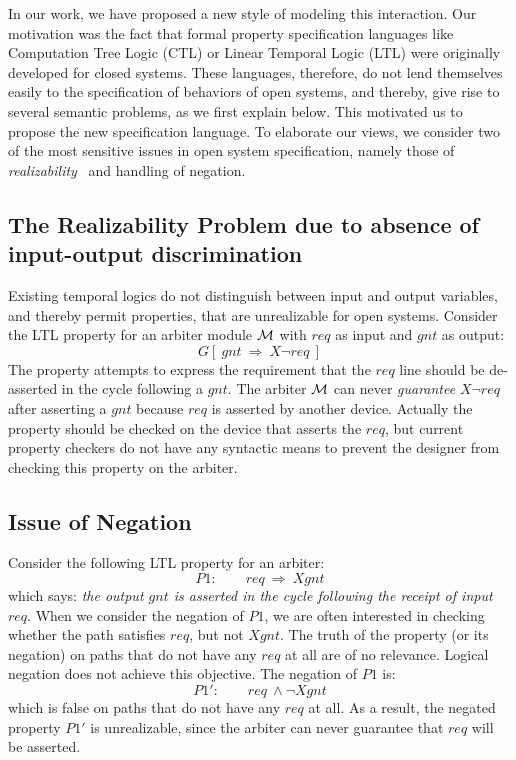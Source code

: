\documentclass[a4paper, 11pt]{article}
\begin{document}
In our work, we have proposed a new style of modeling this interaction. 
Our motivation was the fact that formal property 
specification languages like Computation Tree Logic (CTL) or Linear Temporal 
Logic (LTL) were originally developed for closed systems. These languages, 
therefore, do not lend themselves
easily to the specification of behaviors of open systems, and thereby, 
give rise to several semantic problems, as we first explain below. This 
motivated us to propose the new specification language.
To elaborate our views, we consider two of the most sensitive issues in
open system specification, namely those of {\em realizability}~\cite{rosner}
and handling of negation.

\subsection{The Realizability Problem due to absence of input-output 
	discrimination} \label{sec6.1}
Existing temporal logics do not distinguish between input and output 
variables, and thereby permit properties, that are unrealizable for 
open systems. Consider the LTL
property for an arbiter module ${\cal M}$ with $req$ as input and $gnt$ as
output:
\[  G[\ gnt\ \Rightarrow\ X \neg req\ ] \]
The property attempts to express the requirement that the $req$ line should
be de-asserted in the cycle following a $gnt$. The arbiter ${\cal M}$ can
never {\em guarantee} $X \neg req$ after asserting a $gnt$ because $req$ is
asserted by another device. Actually the property should be checked on the
device that asserts the $req$, but current property checkers
do not have any syntactic means to prevent the designer from checking
this property on the arbiter.

\subsection{Issue of Negation} \label{sec6.2}
\noindent
Consider the following LTL property for an arbiter:
\[ P1: \qquad req\ \Rightarrow\ X gnt \]
which says: {\em the output $gnt$ is asserted in the cycle following the
receipt of input $req$}. When we consider the negation of $P1$,
we are often interested in checking whether the path satisfies
$req$, but not $X gnt$. The truth of the property (or its negation) on paths
that do not have any $req$ at all are of no relevance. 
Logical negation does not achieve this
objective. The negation of $P1$ is:
\[ P1': \qquad req\ \land \neg X gnt \]
which is false on paths that do not have any $req$ at all. As a result, the
negated property $P1'$ is unrealizable, since the arbiter can never guarantee
that $req$ will be asserted.
\end{document}
